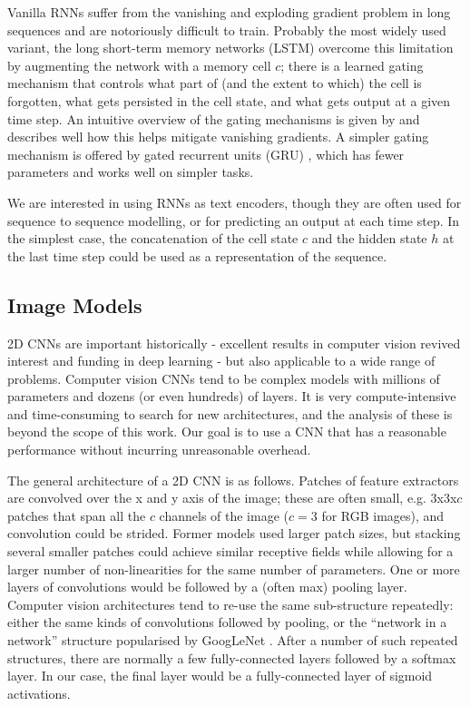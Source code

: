 Vanilla RNNs suffer from the vanishing and exploding gradient problem in long sequences and are notoriously difficult to train.
Probably the most widely used variant, the long short-term memory networks (LSTM) \cite{lstm} overcome this limitation by augmenting the network with a memory cell $c$; there is a learned gating mechanism that controls what part of (and the extent to which) the cell is forgotten, what gets persisted in the cell state, and what gets output at a given time step.
An intuitive overview of the gating mechanisms is given by \cite{colah} and \cite{vanishing} describes well how this helps mitigate vanishing gradients.
A simpler gating mechanism is offered by gated recurrent units (GRU) \cite{gru}, which has fewer parameters and works well on simpler tasks.

We are interested in using RNNs as text encoders, though they are often used for sequence to sequence modelling, or for predicting an output at each time step.
In the simplest case, the concatenation of the cell state $c$ and the hidden state $h$ at the last time step could be used as a representation of the sequence.

\subsection{Image Models}
\label{image_models}

2D CNNs are important historically - excellent results in computer vision revived interest and funding in deep learning - but also applicable to a wide range of problems.
Computer vision CNNs tend to be complex models with millions of parameters and dozens (or even hundreds) of layers.
It is very compute-intensive and time-consuming to search for new architectures, and the analysis of these is beyond the scope of this work.
Our goal is to use a CNN that has a reasonable performance without incurring unreasonable overhead.

The general architecture of a 2D CNN is as follows.
Patches of feature extractors are convolved over the x and y axis of the image; these are often small, e.g. 3x3x$c$ patches that span all the $c$ channels of the image ($c=3$ for RGB images), and convolution could be strided.
Former models used larger patch sizes, but stacking several smaller patches could achieve similar receptive fields while allowing for a larger number of non-linearities for the same number of parameters.
One or more layers of convolutions would be followed by a (often max) pooling layer.
Computer vision architectures tend to re-use the same sub-structure repeatedly: either the same kinds of convolutions followed by pooling, or the ``network in a network'' structure popularised by GoogLeNet \cite{googlenet}.
After a number of such repeated structures, there are normally a few fully-connected layers followed by a softmax layer.
In our case, the final layer would be a fully-connected layer of sigmoid activations.

